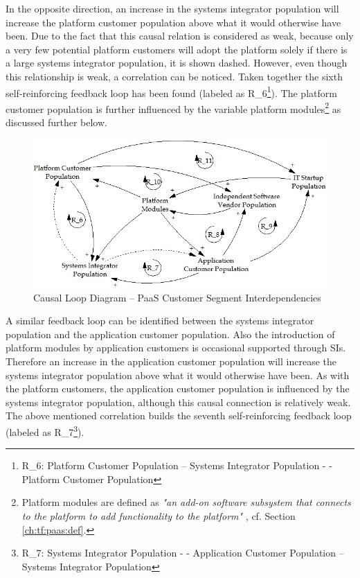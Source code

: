 In the opposite direction, an increase in the systems integrator population will increase the platform customer population above what it would otherwise have been. Due to the fact that this causal relation is considered as weak, because only a very few potential platform customers will adopt the platform solely if there is a large systems integrator population, it is shown dashed. However, even though this relationship is weak, a correlation can be noticed. Taken together the sixth self-reinforcing feedback loop has been found (labeled as R\_6\footnote{R\_6: Platform Customer Population -- Systems Integrator Population - - Platform Customer Population}). The platform customer population is further influenced by the variable platform modules\footnote{Platform modules are defined as \textit{"an add-on software subsystem that connects to the platform to add functionality to the platform"} \citep[p. 676]{Tiwana2010}, cf. Section \ref{ch:tf:paas:def}.} as discussed further below.

\begin{figure}[tb]
	\centering
	\includegraphics[width=\textwidth]{gfx/cld_customerSegmentInterdependencies}
	\caption{Causal Loop Diagram -- PaaS Customer Segment Interdependencies}
	\label{fig:cld_csi}
\end{figure}

A similar feedback loop can be identified between the systems integrator population and the application customer population. Also the introduction of platform modules by application customers is occasional supported through \acp{SI}. Therefore an increase in the application customer population will increase the systems integrator population above what it would otherwise have been. As with the platform customers, the application customer population is influenced by the systems integrator population, although this causal connection is relatively weak. The above mentioned correlation builds the seventh self-reinforcing feedback loop (labeled as R\_7\footnote{R\_7: Systems Integrator Population - - Application Customer Population -- Systems Integrator Population}).


